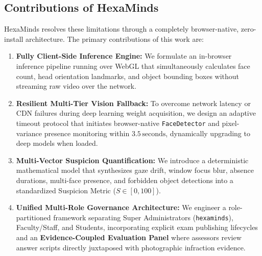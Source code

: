 \documentclass[conference]{IEEEtran}
\begin{document}
\subsection{Contributions of HexaMinds}
HexaMinds resolves these limitations through a completely browser-native, zero-install architecture. The primary contributions of this work are:
\begin{enumerate}
    \item \textbf{Fully Client-Side Inference Engine:} We formulate an in-browser inference pipeline running over WebGL that simultaneously calculates face count, head orientation landmarks, and object bounding boxes without streaming raw video over the network.
    \item \textbf{Resilient Multi-Tier Vision Fallback:} To overcome network latency or CDN failures during deep learning weight acquisition, we design an adaptive timeout protocol that initiates browser-native \texttt{FaceDetector} and pixel-variance presence monitoring within $3.5\,\text{seconds}$, dynamically upgrading to deep models when loaded.
    \item \textbf{Multi-Vector Suspicion Quantification:} We introduce a deterministic mathematical model that synthesizes gaze drift, window focus blur, absence durations, multi-face presence, and forbidden object detections into a standardized Suspicion Metric ($S \in [0, 100]$).
    \item \textbf{Unified Multi-Role Governance Architecture:} We engineer a role-partitioned framework separating Super Administrators (\texttt{hexaminds}), Faculty/Staff, and Students, incorporating explicit exam publishing lifecycles and an \textbf{Evidence-Coupled Evaluation Panel} where assessors review answer scripts directly juxtaposed with photographic infraction evidence.
\end{enumerate}
\end{document}

